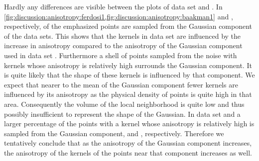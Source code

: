 				Hardly any differences are visible between the plots of data set \ferdosiOne and \baakmanOne. 
					In \cref{fig:discussion:anisotropy:ferdosi1,fig:discussion:anisotropy:baakman1}  and , respectively, of the emphasized points are sampled from the Gaussian component of the data sets. This shows that the kernels in data set \baakmanOne are influenced by the increase in anisotropy compared to the anisotropy of the Gaussian component used in data set \ferdosiOne.
					Furthermore a shell of points sampled from the noise with kernels whose anisotropy is relatively high surrounds the Gaussian component. It is quite likely that the shape of these kernels is influenced by that component. 
					We expect that nearer to the mean of the Gaussian component fewer kernels are influenced by its anisotropy as the physical density of points is quite high in that area. Consequently the volume of the local neighborhood is quite low and thus possibly insufficient to represent the shape of the Gaussian.
				In data set \baakmanFour and \baakmanFive a larger percentage of the points with a kernel whose anisotropy is relatively high is sampled from the Gaussian component,  and , respectively. 
				Therefore we tentatively conclude that as the anisotropy of the Gaussian component increases, the anisotropy of the kernels of the points near that component increases as well.
		
